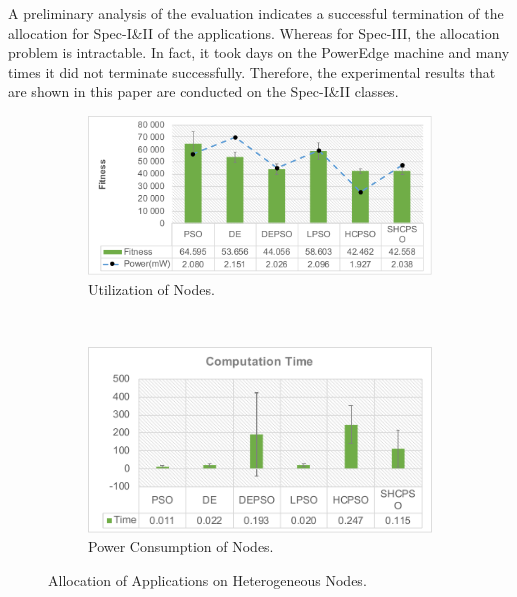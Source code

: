 A preliminary analysis of the evaluation indicates a successful termination of the allocation for Spec-I\&II of the applications. Whereas for Spec-III, the allocation problem is intractable. In fact, it took days on the PowerEdge machine and many times it did not terminate successfully. Therefore, the experimental results that are shown in this paper are conducted on the Spec-I\&II classes. 
\begin{figure}
    \centering
    \begin{subfigure}[b]{0.475  \textwidth}
        \includegraphics[width=\textwidth]{img/fitness_c20_g30_m10.pdf}
        \caption{Utilization of Nodes.}
        \label{fig_util}
    \end{subfigure}
    ~%
        \begin{subfigure}[b]{0.475\textwidth}
        \includegraphics[width=\textwidth]{img/time_c20_g30_m10.pdf}
        \caption{Power Consumption of Nodes.}
        \label{fig_power}
    \end{subfigure}
    \caption{Allocation of Applications on Heterogeneous Nodes.}
    \label{fig_util_power}\vspace{-0.2cm}
\end{figure}




